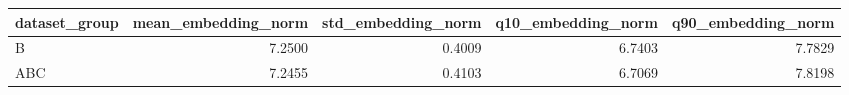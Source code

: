 \begin{tabular}{lrrrr}
\toprule
dataset\_group & mean\_embedding\_norm & std\_embedding\_norm & q10\_embedding\_norm & q90\_embedding\_norm \\
\midrule
B & 7.2500 & 0.4009 & 6.7403 & 7.7829 \\
ABC & 7.2455 & 0.4103 & 6.7069 & 7.8198 \\
\bottomrule
\end{tabular}
